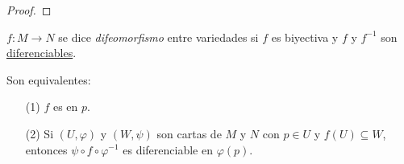 \documentclass[../VD.tex]{subfiles}
\begin{document}
\begin{proof}
\end{proof}

\begin{definition}[difeomorfismo]
  \label{def:difeomorfismo}
  \(f \colon M \to N\) se dice \emph{difeomorfismo} entre variedades si \(f\) es
  biyectiva y \(f\) y \(f^{-1}\) son \hyperref[def:diferenciable]{diferenciables}.
\end{definition}

\begin{lemma}
	Son equivalentes:
	\begin{enumerate}
	\item [(1)] \(f\) es  en \(p\).
	\item [(2)] Si \((U,\varphi)\) y \((W,\psi)\) son cartas de \(M\) y \(N\) con \(p\in U\) y \(f(U)\subseteq W\), entonces \(\psi \circ f \circ \varphi^{-1}\) es diferenciable en \(\varphi(p)\).
	\end{enumerate}
\end{lemma}
\end{document}
